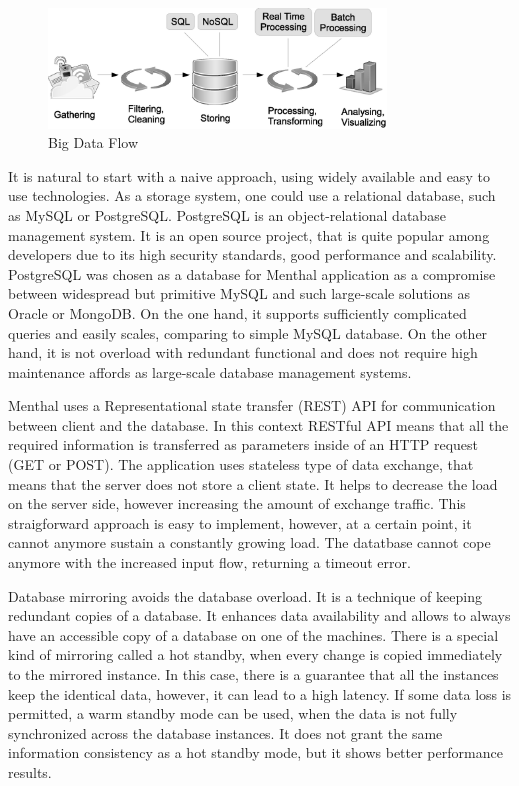 \begin{figure}
  \centering
  \includegraphics [width=0.8\textwidth]{images/big_data_flow}
  \caption{Big Data Flow}
  \label{fig:big_data_flow}
\end{figure}

It is natural to start with a naive approach, using widely available and easy to use technologies.
As a storage system, one could use a relational database, such as MySQL or PostgreSQL.
PostgreSQL is an object-relational database management system.
It is an open source project, that is quite popular among developers due to its high security standards, good performance and scalability.
PostgreSQL was chosen as a database for Menthal application as a compromise between widespread but primitive MySQL and such large-scale solutions as Oracle or MongoDB.
On the one hand, it supports sufficiently complicated queries and easily scales, comparing to simple MySQL database.
On the other hand, it is not overload with redundant functional and does not require high maintenance affords as large-scale database management systems.

Menthal uses a Representational state transfer (REST) API for communication between client and the database.
In this context RESTful API means that all the required information is transferred as parameters inside of an HTTP request (GET or POST).
The application uses stateless type of data exchange, that means that the server does not store a client state.
It helps to decrease the load on the server side, however increasing the amount of exchange traffic.
This straigforward approach is easy to implement, however, at a certain point, it cannot anymore sustain a constantly growing load.
The datatbase cannot cope anymore with the increased input flow, returning a timeout error.

Database mirroring avoids the database overload.
It is a technique of keeping redundant copies of a database.
It enhances data availability and allows to always have an accessible copy of a database on one of the machines.
There is a special kind of mirroring called a hot standby, when every change is copied immediately to the mirrored instance.
In this case, there is a guarantee that all the instances keep the identical data, however, it can lead to a high latency.
If some data loss is permitted, a warm standby mode can be used, when the data is not fully synchronized across the database instances.
It does not grant the same information consistency as a hot standby mode, but it shows better performance results.

